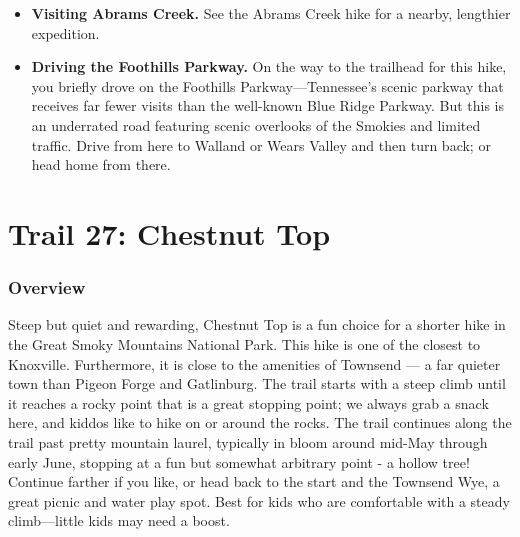 \documentclass[
  letterpaper,
  DIV=11,
  numbers=noendperiod]{scrreprt}
\providecommand{\tightlist}{%
  \setlength{\itemsep}{0pt}\setlength{\parskip}{0pt}}\usepackage{longtable,booktabs,array}
\begin{document}
\begin{itemize}
\tightlist
\item
  \textbf{Visiting Abrams Creek.} See the Abrams Creek hike for a
  nearby, lengthier expedition.
\item
  \textbf{Driving the Foothills Parkway.} On the way to the trailhead
  for this hike, you briefly drove on the Foothills
  Parkway---Tennessee's scenic parkway that receives far fewer visits
  than the well-known Blue Ridge Parkway. But this is an underrated road
  featuring scenic overlooks of the Smokies and limited traffic. Drive
  from here to Walland or Wears Valley and then turn back; or head home
  from there.
\end{itemize}

\chapter{Trail 27: Chestnut Top}\label{trail-27-chestnut-top}

\subsection{Overview}\label{overview-27}

Steep but quiet and rewarding, Chestnut Top is a fun choice for a
shorter hike in the Great Smoky Mountains National Park. This hike is
one of the closest to Knoxville. Furthermore, it is close to the
amenities of Townsend --- a far quieter town than Pigeon Forge and
Gatlinburg. The trail starts with a steep climb until it reaches a rocky
point that is a great stopping point; we always grab a snack here, and
kiddos like to hike on or around the rocks. The trail continues along
the trail past pretty mountain laurel, typically in bloom around mid-May
through early June, stopping at a fun but somewhat arbitrary point - a
hollow tree! Continue farther if you like, or head back to the start and
the Townsend Wye, a great picnic and water play spot. Best for kids who
are comfortable with a steady climb---little kids may need a boost.
\end{document}
